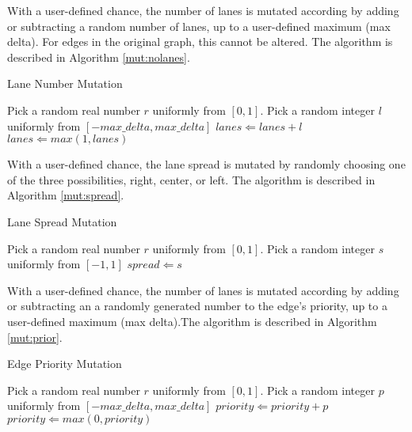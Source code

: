 \documentclass[11pt, oneside, notitlepage, final]{article}
\begin{document}
            With a user-defined chance, the number of lanes is mutated according by adding or subtracting a random number of lanes, up to a user-defined maximum (max delta). For edges in the original graph, this cannot be altered. The algorithm is described in Algorithm \ref{mut:nolanes}.

            \begin{algorithm}
            \caption{Lane Number Mutation}
            \label{mut:nolanes}
            \begin{algorithmic}
            \STATE Pick a random real number $r$ uniformly from $[0, 1]$.
            \STATE Pick a random integer $l$ uniformly from $[-max\_delta, max\_delta]$
            \STATE $lanes \Leftarrow lanes + l$
            \STATE $lanes \Leftarrow max(1, lanes)$
            \ENDIF
            \end{algorithmic}
            \end{algorithm}

            With a user-defined chance, the lane spread is mutated by randomly choosing one of the three possibilities, right, center, or left. The algorithm is described in Algorithm \ref{mut:spread}.

            \begin{algorithm}
            \caption{Lane Spread Mutation}
            \label{mut:spread}
            \begin{algorithmic}
            \STATE Pick a random real number $r$ uniformly from $[0, 1]$.
            \STATE Pick a random integer $s$ uniformly from $[-1, 1]$
            \STATE $spread \Leftarrow s$
            \ENDIF
            \end{algorithmic}
            \end{algorithm}


            With a user-defined chance, the number of lanes is mutated according by adding or subtracting an a randomly generated number to the edge's priority, up to a user-defined maximum (max delta).The algorithm is described in Algorithm \ref{mut:prior}.
            \begin{algorithm}
            \caption{Edge Priority Mutation}
            \label{mut:prior}
            \begin{algorithmic}
            \STATE Pick a random real number $r$ uniformly from $[0, 1]$.
            \STATE Pick a random integer $p$ uniformly from $[-max\_delta, max\_delta]$
            \STATE $priority \Leftarrow priority + p$
            \STATE $priority \Leftarrow max(0, priority)$
            \ENDIF
            \end{algorithmic}
            \end{algorithm}
\end{document}
